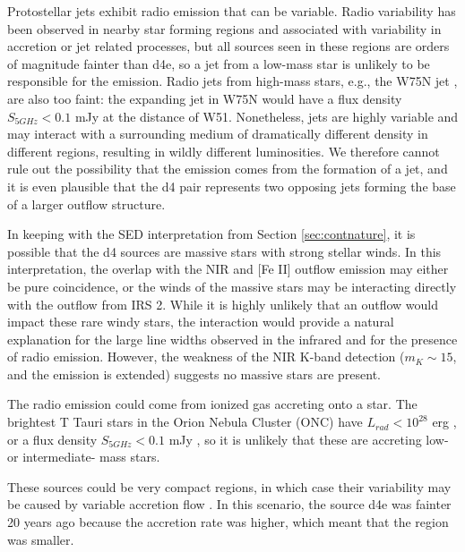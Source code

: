 Protostellar jets exhibit radio emission that can be variable.  Radio
variability has been observed in nearby star forming regions
\citep{Liu2014c,Forbrich2013a} and associated with variability in accretion or
jet related processes, but all sources seen in these regions are orders of
magnitude fainter than d4e, so a jet from a low-mass star is unlikely to be
responsible for the emission.  Radio jets from high-mass stars, e.g., the W75N
jet \citep{Carrasco-Gonzalez2015a}, are also too faint: the expanding jet in
W75N would have a flux density $S_{5 GHz} < 0.1$ mJy at the distance of W51.
Nonetheless, jets are highly variable and may interact with a surrounding
medium of dramatically different density in different regions, resulting in
wildly different luminosities.  We therefore cannot rule out the possibility
that the emission comes from the formation of a jet, and it is even plausible
that the d4 pair represents two opposing jets forming the base of a larger
outflow structure.

In keeping with the SED interpretation from Section \ref{sec:contnature}, it is
possible that the d4 sources are massive stars with strong stellar winds.  In
this interpretation, the overlap with the NIR \hh and [Fe II] outflow emission
\citep[Figure \ref{fig:d4h2}][]{Hodapp2002a} may either be pure
coincidence, or the winds of the massive stars may be interacting directly with
the outflow from IRS 2.  While it is highly unlikely that an outflow would
impact these rare windy stars, the interaction would provide a natural
explanation for the large line widths observed in the infrared and for the
presence of radio emission.  However, the weakness of the NIR K-band detection
($m_K \sim 15$, and the emission is extended) suggests no massive stars are
present.

The radio emission could come from ionized gas accreting onto a star.  The
brightest T Tauri stars in the Orion Nebula Cluster (ONC) have
$L_{rad}<10^{28}$ erg \pers, or a flux density $S_{5 GHz} < 0.1$ mJy
\citep{Forbrich2013a,Zapata2004a}, so it is unlikely that these are accreting
low- or intermediate- mass stars.  

These sources could be very compact \hchii regions, in which case their
variability may be caused by variable accretion flow
\citep{Peters2010c,Galvan-Madrid2011d,de-Pree2014a}.  In this scenario, the
source d4e was fainter 20 years ago because the accretion rate was higher,
which meant that the \hchii region was smaller.

